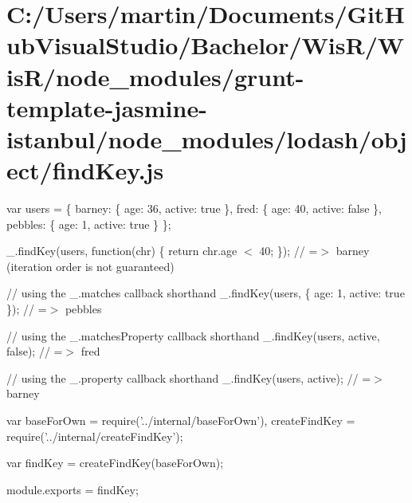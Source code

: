 \hypertarget{_c_1_2_users_2martin_2_documents_2_git_hub_visual_studio_2_bachelor_2_wis_r_2_wis_r_2node_module23387f7f64052d20b58277274521ad70}{}\section{C\+:/\+Users/martin/\+Documents/\+Git\+Hub\+Visual\+Studio/\+Bachelor/\+Wis\+R/\+Wis\+R/node\+\_\+modules/grunt-\/template-\/jasmine-\/istanbul/node\+\_\+modules/lodash/object/find\+Key.\+js}
var users = \{ \textquotesingle{}barney\textquotesingle{}\+: \{ \textquotesingle{}age\textquotesingle{}\+: 36, \textquotesingle{}active\textquotesingle{}\+: true \}, \textquotesingle{}fred\textquotesingle{}\+: \{ \textquotesingle{}age\textquotesingle{}\+: 40, \textquotesingle{}active\textquotesingle{}\+: false \}, \textquotesingle{}pebbles\textquotesingle{}\+: \{ \textquotesingle{}age\textquotesingle{}\+: 1, \textquotesingle{}active\textquotesingle{}\+: true \} \};

\+\_\+.\+find\+Key(users, function(chr) \{ return chr.\+age $<$ 40; \}); // =$>$ \textquotesingle{}barney\textquotesingle{} (iteration order is not guaranteed)

// using the {\ttfamily \+\_\+.\+matches} callback shorthand \+\_\+.\+find\+Key(users, \{ \textquotesingle{}age\textquotesingle{}\+: 1, \textquotesingle{}active\textquotesingle{}\+: true \}); // =$>$ \textquotesingle{}pebbles\textquotesingle{}

// using the {\ttfamily \+\_\+.\+matches\+Property} callback shorthand \+\_\+.\+find\+Key(users, \textquotesingle{}active\textquotesingle{}, false); // =$>$ \textquotesingle{}fred\textquotesingle{}

// using the {\ttfamily \+\_\+.\+property} callback shorthand \+\_\+.\+find\+Key(users, \textquotesingle{}active\textquotesingle{}); // =$>$ \textquotesingle{}barney\textquotesingle{}


\begin{DoxyCodeInclude}
var baseForOwn = require(\textcolor{stringliteral}{'../internal/baseForOwn'}),
    createFindKey = require(\textcolor{stringliteral}{'../internal/createFindKey'});

var findKey = createFindKey(baseForOwn);

module.exports = findKey;
\end{DoxyCodeInclude}
 